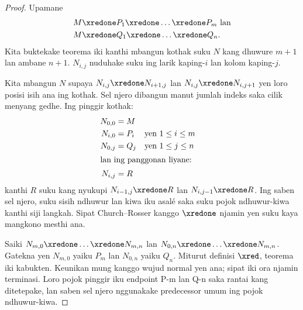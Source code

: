 \documentclass[../../../include/open-logic-section]{subfiles}
\begin{document}
\begin{proof}
  Upamane
  \begin{align*}
    M & \xredone P_1 \xredone \dots \xredone P_m \text{ lan}\\
    M & \xredone Q_1 \xredone \dots \xredone Q_n.
  \end{align*}
  Kita buktekake teorema iki
  kanthi mbangun kothak suku $N$
  kang dhuwure $m + 1$ lan
  ambane $n + 1$.
  $N_{i,j}$ nuduhake suku
  ing larik kaping-$i$ lan
  kolom kaping-$j$.
  
  Kita mbangun $N$ supaya
  $N_{i,j} \xredone N_{i+1,j}$
  lan $N_{i,j} \xredone N_{i,j+1}$ yen loro posisi isih ana ing kothak. Sel njero dibangun manut jumlah indeks saka cilik menyang gedhe.
  Ing pinggir kothak:
  \begin{align*}
    N_{0,0} &= M \\
    N_{i,0} &= P_i && \text{yen } 1 \le i \le m \\
    N_{0,j} &= Q_j && \text{yen } 1 \le j \le n \\
  \intertext{lan ing panggonan liyane:}
    N_{i,j} &= R
  \end{align*}
  kanthi $R$ suku kang nyukupi
  $N_{i-1,j} \xredone R$ lan
  $N_{i,j-1} \xredone R$.
  Ing saben sel njero, suku
  sisih ndhuwur lan kiwa iku
  asalé saka suku pojok
  ndhuwur-kiwa kanthi
  siji langkah.
  Sipat Church--Rosser kanggo
  $\xredone$ njamin yen suku
  kaya mangkono mesthi ana.

  Saiki $N_{m,0} \xredone \dots
  \xredone N_{m,n}$ lan
  $N_{0,n} \xredone \dots
  \xredone N_{m,n}$.
  Gatekna yen $N_{m,0}$
  yaiku $P_m$ lan $N_{0,n}$
  yaiku $Q_n$.
  Miturut definisi $\xred$,
  teorema iki kabukten. Keunikan mung kanggo wujud normal yen ana; sipat iki ora njamin terminasi. Loro pojok pinggir iku endpoint P-m lan Q-n saka rantai kang ditetepake, lan saben sel njero nggunakake predecessor umum ing pojok ndhuwur-kiwa.
\end{proof}
\end{document}
